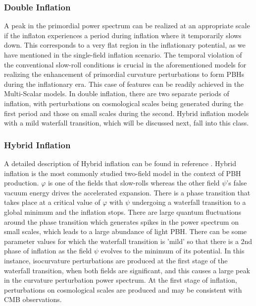 \subsubsection{Double Inflation}
A peak in the primordial power spectrum can be realized at an appropriate scale if the inflaton experiences a period during inflation where it temporarily slows down. This corresponds to a very flat region in the inflationary potential, as we have mentioned in the single-field inflation scenario. The temporal violation of the conventional slow-roll conditions is crucial in the aforementioned models for realizing the enhancement of primordial curvature perturbations to form PBHs during the inflationary era. This case of features can be readily achieved in the Multi-Scalar models. In double inflation, there are two separate periods of inflation, with
perturbations on cosmological scales being generated during the first period and those on small scales during the second. Hybrid inflation models with a mild waterfall transition, which will be discussed next, fall into this class. 
\subsubsection{Hybrid Inflation}
A detailed description of Hybrid inflation can be found in reference \cite{PhysRevD.54.6040} \cite{PhysRevD.92.023524}. Hybrid inflation is the most commonly studied two-field model in the context of PBH production. $\varphi$ is one of the fields that slow-rolls whereas the other field $\psi$'s false vacuum energy  drives the accelerated expansion. There is a phase transition that takes place at a critical value of $\varphi$ with $\psi$ undergoing a waterfall transition to a global minimum and the inflation stops. There are large quantum fluctuations around the phase transition which generates spikes in the power spectrum on small scales, which leads to a large abundance of light PBH. There can be some parameter values for which the waterfall transition is 'mild' so that there is a 2nd phase of inflation as the field $\psi$ evolves to the minimum of its potential. In this instance, isocurvature perturbations are produced at the first stage of the waterfall transition, when both fields are significant, and this causes a large peak in the curvature perturbation power spectrum. At the first stage of inflation, perturbations on cosmological scales are produced and may be consistent with CMB observations.\\


